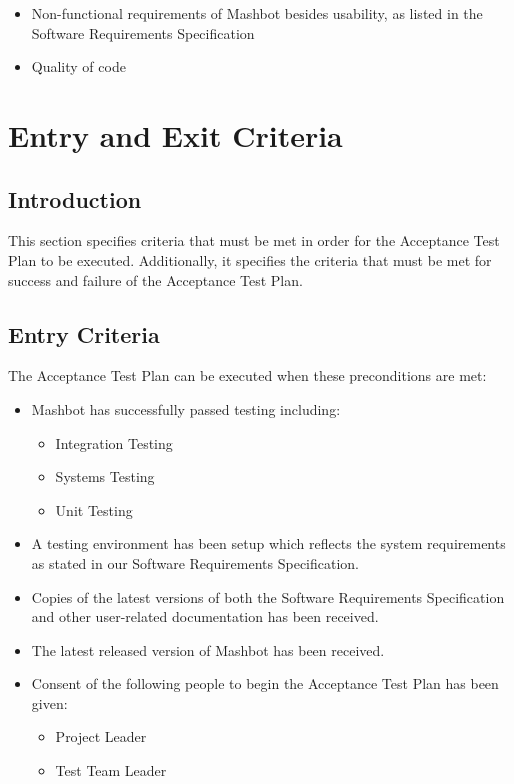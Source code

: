 \documentclass{article}
\begin{document}
\begin{itemize}
\item Non-functional requirements of Mashbot besides usability, as listed in
the Software Requirements Specification
\item Quality of code
\end{itemize}

\section{Entry and Exit Criteria} %


\subsection{Introduction}
	This section specifies criteria that must be met in order for the Acceptance 
	Test Plan to be executed. Additionally, it specifies the criteria that must 
	be met for success and failure of the Acceptance Test Plan.
\subsection{Entry Criteria}
	The Acceptance Test Plan can be executed when these preconditions are met:
	\begin{itemize}
		\item Mashbot has successfully passed testing including:
			\begin{itemize}
				\item Integration Testing
				\item Systems Testing
				\item Unit Testing
			\end{itemize}
		\item A testing environment has been setup which reflects the system 
		requirements as stated in our Software Requirements Specification.
		\item Copies of the latest versions of both the Software Requirements 
		Specification and other user-related documentation has been received.
		\item The latest released version of Mashbot has been received.
		\item Consent of the following people to begin the Acceptance Test Plan 
		has been given:
			\begin{itemize}
				\item Project Leader
				\item Test Team Leader
			\end{itemize}
	\end{itemize}
\end{document}
